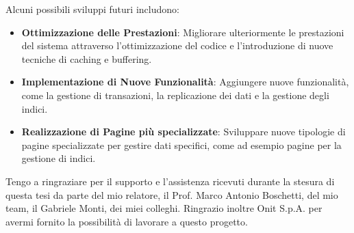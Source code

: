 \documentclass[12pt,a4paper,openright,twoside]{book}
\begin{document}
        Alcuni possibili sviluppi futuri includono:

        \begin{itemize}
            \item \textbf{Ottimizzazione delle Prestazioni}: Migliorare ulteriormente le prestazioni del sistema attraverso l'ottimizzazione del codice e l'introduzione di nuove tecniche di caching e buffering.
            \item \textbf{Implementazione di Nuove Funzionalità}: Aggiungere nuove funzionalità, come la gestione di transazioni, la replicazione dei dati e la gestione degli indici.
            \item \textbf{Realizzazione di Pagine più specializzate}: Sviluppare nuove tipologie di pagine specializzate per gestire dati specifici, come ad esempio pagine per la gestione di indici.
        \end{itemize}


\backmatter

\nocite{*} %




\begin{acknowledgements}
    Tengo a ringraziare per il supporto e l'assistenza ricevuti durante la stesura di questa tesi da parte del mio relatore, il Prof. Marco Antonio Boschetti, del mio team, il Gabriele Monti, dei miei colleghi.
    Ringrazio inoltre Onit S.p.A. per avermi fornito la possibilità di lavorare a questo progetto.
\end{acknowledgements}
\end{document}
